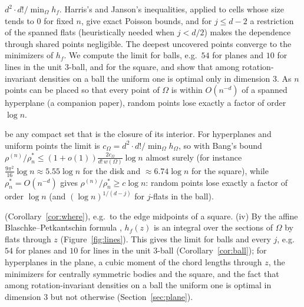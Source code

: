
$d^2\cdot d!/\min_\Omega h_f$. Harris's and Janson's inequalities, applied to cells whose size tends to $0$ for fixed $n$, give exact
Poisson bounds, and for $j\le d-2$ a restriction of the spanned flats (heuristically needed when $j<d/2$) makes the dependence through shared points negligible. The
deepest uncovered points converge to the minimizers of $h_f$. We compute the limit for balls, e.g.\ $54$ for planes and $10$ for
lines in the unit $3$-ball, and for the square, and show that among rotation-invariant densities on a ball the uniform one is
optimal only in dimension $3$. As $n$ points can be placed so that every point of $\Omega$ is within $O(n^{-d})$ of a spanned
hyperplane (a companion paper), random points lose exactly a factor of order $\log n$.

be any compact set that is the closure of its interior. For hyperplanes and uniform points the limit is $c_\Omega=d^2\cdot
d!/\min_\Omega h_\Omega$, so with Bang's bound $\rho^{(n)}/\rho^*_n\le(1+o(1))\frac{2c_\Omega}{d!\,w(\Omega)}\log n$ almost surely (for
instance $\frac{9\pi^2}{16}\log n\approx5.55\log n$ for the disk and $\approx6.74\log n$ for the square), while $\rho^*_n=O(n^{-d})$ gives
$\rho^{(n)}/\rho^*_n\ge c\log n$: random points lose exactly a factor of order $\log n$ (and $(\log n)^{1/(d-j)}$ for $j$-flats in
the ball).

(Corollary~\ref{cor:where}), e.g.\ to the edge midpoints of a square. (iv) By the affine Blaschke--Petkantschin formula
\cite[Theorem~7.2.7]{SW}, $h_f(z)$ is an integral over the sections of $\Omega$ by flats through $z$ (Figure~\ref{fig:lines}). This gives the limit for
balls and every $j$, e.g.\ $54$ for planes and $10$ for lines in the unit $3$-ball (Corollary~\ref{cor:ball}); for hyperplanes
in the plane, a cubic moment of the chord lengths through $z$, the minimizers for centrally symmetric bodies and the square, and
the fact that among rotation-invariant densities on a ball the uniform one is optimal in dimension $3$ but not otherwise
(Section~\ref{sec:plane}).


